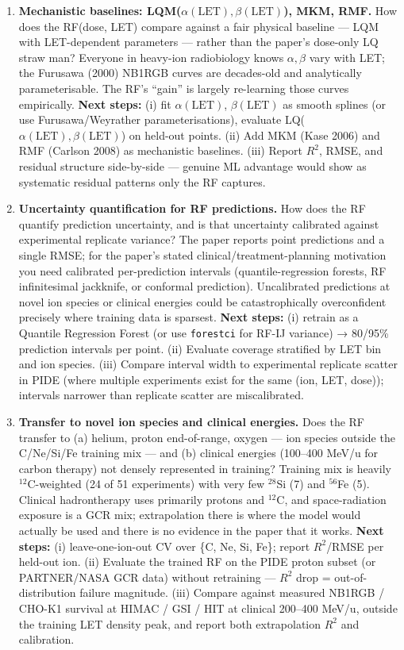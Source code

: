 \begin{enumerate}[leftmargin=*,label=\textbf{Q\arabic*.}]
\item \textbf{Mechanistic baselines: LQM($\alpha(\mathrm{LET}), \beta(\mathrm{LET})$), MKM, RMF.} How does the RF(dose, LET) compare against a fair physical baseline --- LQM with LET-dependent parameters --- rather than the paper's dose-only LQ straw man? Everyone in heavy-ion radiobiology knows $\alpha,\beta$ vary with LET; the Furusawa (2000) NB1RGB curves are decades-old and analytically parameterisable. The RF's ``gain'' is largely re-learning those curves empirically. \textbf{Next steps:} (i) fit $\alpha(\mathrm{LET})$, $\beta(\mathrm{LET})$ as smooth splines (or use Furusawa/Weyrather parameterisations), evaluate LQ($\alpha(\mathrm{LET}), \beta(\mathrm{LET})$) on held-out points. (ii) Add MKM (Kase 2006) and RMF (Carlson 2008) as mechanistic baselines. (iii) Report $R^2$, RMSE, and residual structure side-by-side --- genuine ML advantage would show as systematic residual patterns only the RF captures.

\item \textbf{Uncertainty quantification for RF predictions.} How does the RF quantify prediction uncertainty, and is that uncertainty calibrated against experimental replicate variance? The paper reports point predictions and a single RMSE; for the paper's stated clinical/treatment-planning motivation you need calibrated per-prediction intervals (quantile-regression forests, RF infinitesimal jackknife, or conformal prediction). Uncalibrated predictions at novel ion species or clinical energies could be catastrophically overconfident precisely where training data is sparsest. \textbf{Next steps:} (i) retrain as a Quantile Regression Forest (or use \texttt{forestci} for RF-IJ variance) → 80/95\% prediction intervals per point. (ii) Evaluate coverage stratified by LET bin and ion species. (iii) Compare interval width to experimental replicate scatter in PIDE (where multiple experiments exist for the same (ion, LET, dose)); intervals narrower than replicate scatter are miscalibrated.

\item \textbf{Transfer to novel ion species and clinical energies.} Does the RF transfer to (a) helium, proton end-of-range, oxygen --- ion species outside the C/Ne/Si/Fe training mix --- and (b) clinical energies (100--400 MeV/u for carbon therapy) not densely represented in training? Training mix is heavily $^{12}$C-weighted (24 of 51 experiments) with very few $^{28}$Si (7) and $^{56}$Fe (5). Clinical hadrontherapy uses primarily protons and $^{12}$C, and space-radiation exposure is a GCR mix; extrapolation there is where the model would actually be used and there is no evidence in the paper that it works. \textbf{Next steps:} (i) leave-one-ion-out CV over \{C, Ne, Si, Fe\}; report $R^2$/RMSE per held-out ion. (ii) Evaluate the trained RF on the PIDE proton subset (or PARTNER/NASA GCR data) without retraining --- $R^2$ drop = out-of-distribution failure magnitude. (iii) Compare against measured NB1RGB / CHO-K1 survival at HIMAC / GSI / HIT at clinical 200--400 MeV/u, outside the training LET density peak, and report both extrapolation $R^2$ and calibration.

\end{enumerate}
